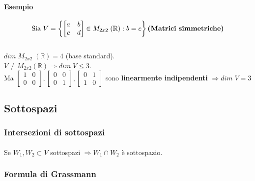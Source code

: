 \documentclass[a4paper, 12pt]{report}
\begin{document}
                \paragraph{Esempio}
                $$
                \text{Sia }
                V=\left \{
                \begin{bmatrix}
                    a & b\\
                    c & d
                \end{bmatrix}
                \in M_{2x2} \; (\mathbb{R}):b=c \right \}
                \text{\textbf{(Matrici simmetriche)}}
                $$\\
                $dim \; M_{2x2} \; (\mathbb{R})=4$ (base standard).\\[4px]
                $V \neq M_{2x2}(\mathbb{R}) \Rightarrow dim \; V \leq 3$.\\[4px]
                Ma 
                $
                \begin{bmatrix}
                    1 & 0\\
                    0 & 0
                \end{bmatrix}
                ,
                \begin{bmatrix}
                    0 & 0\\
                    0 & 1
                \end{bmatrix}
                ,
                \begin{bmatrix}
                    0 & 1\\
                    1 & 0
                \end{bmatrix}
                $ sono \textbf{linearmente indipendenti} $\Rightarrow dim \; V=3$
            \subsection{Sottospazi}
                \subsubsection{Intersezioni di sottospazi}
                \paragraph{}Se $W_1,W_2 \subset V$ sottospazi $\Rightarrow W_1 \cap W_2$ è sottospazio.
                \subsubsection{Formula di Grassmann}
\end{document}
